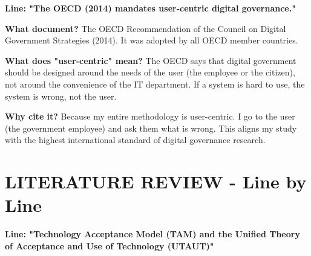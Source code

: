 \documentclass[11pt,a4paper]{article}
\begin{document}
\textbf{Line: "The OECD (2014) mandates user-centric digital governance."}

\begin{abox}
\textbf{What document?} The OECD Recommendation of the Council on Digital Government Strategies (2014). It was adopted by all OECD member countries.

\textbf{What does "user-centric" mean?} The OECD says that digital government should be designed around the needs of the user (the employee or the citizen), not around the convenience of the IT department. If a system is hard to use, the system is wrong, not the user.

\textbf{Why cite it?} Because my entire methodology is user-centric. I go to the user (the government employee) and ask them what is wrong. This aligns my study with the highest international standard of digital governance research.
\end{abox}

\section{LITERATURE REVIEW - Line by Line}

\textbf{Line: "Technology Acceptance Model (TAM) and the Unified Theory of Acceptance and Use of Technology (UTAUT)"}
\end{document}
